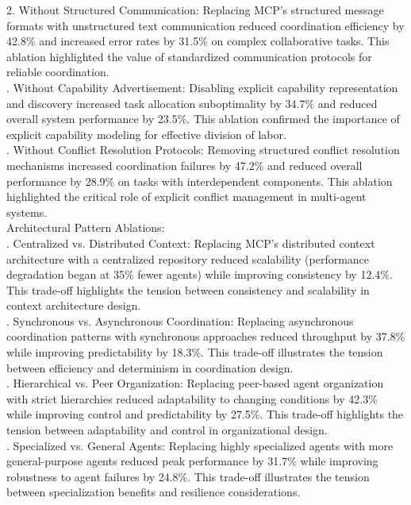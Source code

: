 2. Without Structured Communication: Replacing MCP's structured message formats with unstructured text communication reduced coordination efficiency by 42.8\% and increased error rates by 31.5\% on complex collaborative tasks. This ablation highlighted the value of standardized communication protocols for reliable coordination.\\ . Without Capability Advertisement: Disabling explicit capability representation and discovery increased task allocation suboptimality by 34.7\% and reduced overall system performance by 23.5\%. This ablation confirmed the importance of explicit capability modeling for effective division of labor.\\ . Without Conflict Resolution Protocols: Removing structured conflict resolution mechanisms increased coordination failures by 47.2\% and reduced overall performance by 28.9\% on tasks with interdependent components. This ablation highlighted the critical role of explicit conflict management in multi-agent systems.\\ \newline
Architectural Pattern Ablations:\\ . Centralized vs. Distributed Context: Replacing MCP's distributed context architecture with a centralized repository reduced scalability (performance degradation began at 35\% fewer agents) while improving consistency by 12.4\%. This trade-off highlights the tension between consistency and scalability in context architecture design.\\ . Synchronous vs. Asynchronous Coordination: Replacing asynchronous coordination patterns with synchronous approaches reduced throughput by 37.8\% while improving predictability by 18.3\%. This trade-off illustrates the tension between efficiency and determinism in coordination design.\\ . Hierarchical vs. Peer Organization: Replacing peer-based agent organization with strict hierarchies reduced adaptability to changing conditions by 42.3\% while improving control and predictability by 27.5\%. This trade-off highlights the tension between adaptability and control in organizational design.\\ . Specialized vs. General Agents: Replacing highly specialized agents with more general-purpose agents reduced peak performance by 31.7\% while improving robustness to agent failures by 24.8\%. This trade-off illustrates the tension between specialization benefits and resilience considerations.\\ \newline
